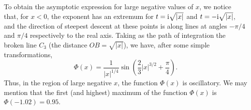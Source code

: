 To obtain the asymptotic expression for large negative values of $ x $, we notice that, for $ x < 0 $, the exponent has an extremum for $ t = \mathrm{i}\sqrt{|x|} $ and $ t = -\mathrm{i}\sqrt{|x|} $, and the direction of steepest descent at these points is along lines at angles $ -\pi/4 $ and $ \pi/4 $ respectively to the real axis. Taking as the path of integration the broken line $ C_3 $ (the distance $ OB = \sqrt{|x|} $), we have, after some simple transformations,
\begin{equation}\label{b.5}
\Phi(x)=\frac{1}{|x|^{1/4}}\sin\left(\frac{2}{3}|x|^{3/2}+\frac{\pi}{4} \right).
\end{equation}
Thus, in the region of large negative $ x $, the function $ \Phi(x) $ is oscillatory. We may mention that the first (and highest) maximum of the function $ \Phi(x) $ is $ \Phi(−1.02) = 0.95 $.

